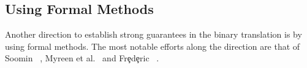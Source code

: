 %    
%    

\subsection{Using Formal Methods}
Another direction to establish strong guarantees in the binary translation is by using
formal methods. The most notable efforts along the direction are that of Soomin
\etal~\cite{ASE2017}, Myreen et al.~\cite{Myreen:FMCAD:2008,Myreen:FMCAD:2012}
and Fr\c{e}d\c{e}ric \etal~\cite{inlineassm}.


